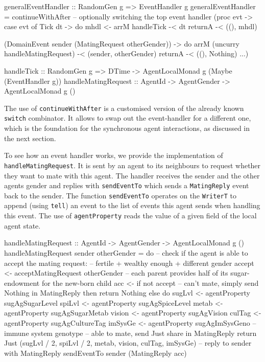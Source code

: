 \begin{HaskellCode}              
generalEventHandler :: RandomGen g => EventHandler g
generalEventHandler =
  continueWithAfter -- optionally switching the top event handler 
    (proc evt -> 
      case evt of 
        Tick dt -> do
          mhdl <- arrM handleTick -< dt
          returnA -< ((), mhdl)

        (DomainEvent sender (MatingRequest otherGender)) -> do
          arrM (uncurry handleMatingRequest) -< (sender, otherGender)
          returnA -< ((), Nothing)
        ...)
        
handleTick :: RandomGen g => DTime -> AgentLocalMonad g (Maybe (EventHandler g))
handleMatingRequest :: AgentId -> AgentGender -> AgentLocalMonad g ()
\end{HaskellCode}

The use of \texttt{continueWithAfter} is a customised version of the already known \texttt{switch} combinator. It allows to swap out the event-handler for a different one, which is the foundation for the synchronous agent interactions, as discussed in the next section.

To see how an event handler works, we provide the implementation of \\ \texttt{handleMatingRequest}. It is sent by an agent to its neighbours to request whether they want to mate with this agent. The handler receives the sender and the other agents gender and replies with \texttt{sendEventTo} which sends a \texttt{MatingReply} event back to the sender. The function \texttt{sendEventTo} operates on the \texttt{WriterT} to append (using \texttt{tell}) an event to the list of events this agent sends when handling this event. The use of \texttt{agentProperty} reads the value of a given field of the local agent state. 

\begin{HaskellCode}
handleMatingRequest :: AgentId
                    -> AgentGender
                    -> AgentLocalMonad g ()
handleMatingRequest sender otherGender = do
  -- check if the agent is able to accept the mating request: 
  -- fertile + wealthy enough + different gender
  accept <- acceptMatingRequest otherGender
  -- each parent provides half of its sugar-endowment for the new-born child
  acc <- if not accept
      -- can't mate, simply send Nothing in MatingReply
      then return Nothing
      else do
        sugLvl  <- agentProperty sugAgSugarLevel
        spiLvl  <- agentProperty sugAgSpiceLevel
        metab   <- agentProperty sugAgSugarMetab
        vision  <- agentProperty sugAgVision
        culTag  <- agentProperty sugAgCultureTag
        imSysGe <- agentProperty sugAgImSysGeno -- immune system genotype
        -- able to mate, send Just share in MatingReply
        return Just (sugLvl / 2, spiLvl / 2, metab, vision, culTag, imSysGe)
  -- reply to sender with MatingReply
  sendEventTo sender (MatingReply acc)
\end{HaskellCode}

